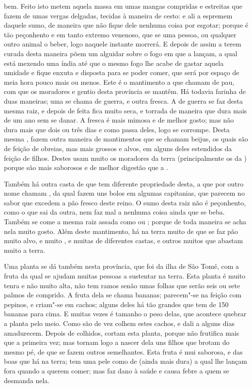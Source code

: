 bem. Feito isto metem aquela massa em umas mangas compridas e estreitas 
que fazem de umas vergas delgadas, tecidas à
maneira de cesto: e ali a espremem daquele sumo, de maneira que não
fique dele nenhuma coisa por esgotar; porque é tão peçonhento e em			%
tanto extremo venenoso, que se uma pessoa, ou qualquer outro animal o
beber, logo naquele instante morrerá. E depois de assim a terem curada
desta maneira põem um alguidar sobre o fogo em que a lançam, a qual
está mexendo uma índia até que o mesmo fogo lhe acabe de gastar aquela
umidade e fique enxuta e disposta para se poder comer, que será por
espaço de meia hora pouco mais ou menos. Este é o mantimento a que
chamam  de pau, com que os moradores e gentio desta província se					%
mantêm. Há todavia farinha de duas maneiras; uma se chama de guerra, e
outra fresca.  A de guerra se faz desta mesma raiz, e depois de
feita fica muito seca, e torrada de maneira que dura mais de um ano sem
se danar. A fresca é mais mimosa e de melhor gosto; mas não dura mais
que dois ou três dias e como passa deles, logo se corrompe. Desta mesma
, fazem outra maneira de mantimentos que se chamam beijus, os		%
quais são de feição de obreias, mas mais grossos e alvos, em alguns
deles estendidos da feição de filhos. Destes usam muito os moradores da
terra (principalmente os da ) porque são mais
saborosos e de melhor digestão que a .

Também há outra casta de  que tem diferente propriedade desta, a
que por outro nome chamam , da qual fazem uns bolos em algumas
capitanias, que parecem no sabor que excedem a pão fresco deste reino. O
sumo desta raiz não é peçonhento, como o que sai da outra, nem faz mal
a nenhuma coisa ainda que se beba. Também se come a mesma raiz assada
como  ou ; porque de toda maneira se acha nela muito gosto.
Além deste mantimento, há na terra muito  de que se faz
pão muito alvo, e muito , e muitas  de diferentes castas, e
outros muitos  que abastam muito a terra.

Uma planta se dá também nesta província, que foi da ilha de São Tomé,			%
com a fruta da qual se ajudam muitas pessoas a sustentar na terra.			%
Esta planta é muito tenra e não muito alta, não tem ramos senão umas
folhas que serão seis ou sete palmos de comprido. A fruta dela se
chama bananas; parecem"-se na feição com pepinos, e criam"-se em cachos;		%
alguns deles há tão grandes que tem de 150 bananas para
cima. E muitas vezes é tamanho o peso delas, que acontece quebrar a
planta pelo meio. Como são de vez colhem estes cachos, e dali a alguns
dias amadurecem. Depois de colhidos, cortam esta planta, porque não
frutifica mais que a primeira vez; mas tornam logo a nascer dela uns
filhos que brotam do mesmo pé, de que se fazem outros semelhantes. Esta
fruta é mui saborosa, e das boas que há na terra; tem uma pele como de
 (ainda mais dura) a qual lhe lançam fora quando a querem comer;
mas faz dano à saúde e causa febre a quem se desmanda nela.

